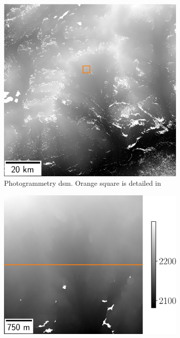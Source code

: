 \begin{figure}
    \begin{subfigure}[t]{0.3\linewidth}
        \flushleft
        \includegraphics[width=\linewidth]{Images/Chap_6/Grenoble_dsm_full_3600-4000_4600-5000.png}
        \caption{Photogrammetry \acrshort{dsm}. Orange square is detailed in }
        \label{fig:grenoble_dsm_full}
    \end{subfigure}\hfill
    \begin{subfigure}[t]{0.3\linewidth}
        \centering
        \includegraphics[width=\linewidth]{Images/Chap_6/Grenoble_dsm_zoom_3600-4000_4600-5000.png}

\end{subfigure}
\end{figure}
